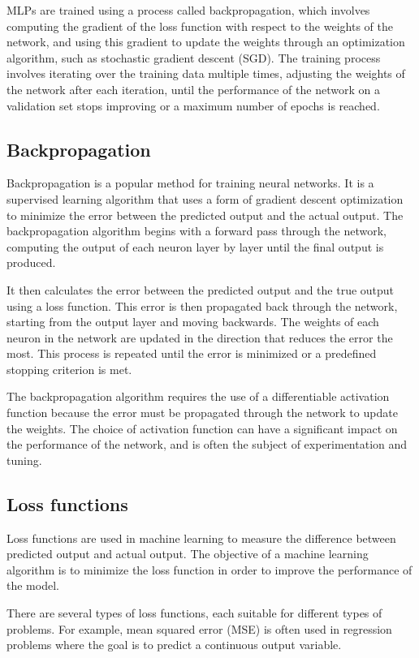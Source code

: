MLPs are trained using a process called backpropagation, which involves computing the gradient of the loss function with respect to the weights of the network, and using this gradient to update the weights through an optimization algorithm, such as stochastic gradient descent (SGD). 
The training process involves iterating over the training data multiple times, adjusting the weights of the network after each iteration, until the performance of the network on a validation set stops improving or a maximum number of epochs is reached.


\subsection{Backpropagation}

Backpropagation is a popular method for training neural networks.
It is a supervised learning algorithm that uses a form of gradient descent optimization to minimize the error between the predicted output and the actual output.
The backpropagation algorithm begins with a forward pass through the network, computing the output of each neuron layer by layer until the final output is produced.

It then calculates the error between the predicted output and the true output using a loss function.
This error is then propagated back through the network, starting from the output layer and moving backwards.
The weights of each neuron in the network are updated in the direction that reduces the error the most. 
This process is repeated until the error is minimized or a predefined stopping criterion is met.

The backpropagation algorithm requires the use of a differentiable activation function because the error must be propagated through the network to update the weights.
The choice of activation function can have a significant impact on the performance of the network, and is often the subject of experimentation and tuning.

\subsection{Loss functions}

Loss functions are used in machine learning to measure the difference between predicted output and actual output. 
The objective of a machine learning algorithm is to minimize the loss function in order to improve the performance of the model.

There are several types of loss functions, each suitable for different types of problems. For example, mean squared error (MSE) is often used in regression problems where the goal is to predict a continuous output variable.

